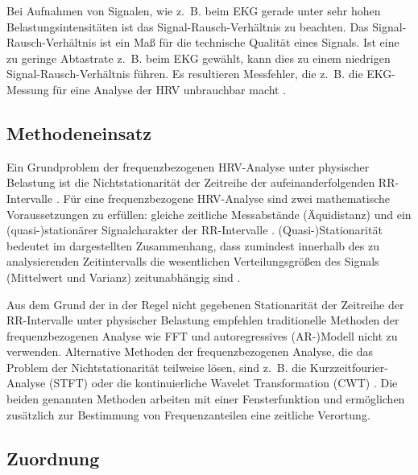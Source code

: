 Bei Aufnahmen von Signalen, wie z.~B. beim \ac{EKG} gerade unter sehr hohen Belastungsintensitäten ist das Signal-Rausch-Verhältnis zu beachten. Das Signal-Rausch-Verhältnis ist ein Maß für die technische Qualität eines Signals. Ist eine zu geringe Abtastrate z.~B. beim \ac{EKG} gewählt, kann dies zu einem niedrigen Signal-Rausch-Verhältnis führen. Es resultieren Messfehler, die z.~B. die \ac{EKG}-Messung für eine Analyse der \ac{HRV} unbrauchbar macht \citep[][]{Hoos2010}.


\subsection{Methodeneinsatz} %
\label{sub:methodeneinsatz}

Ein Grundproblem der frequenzbezogenen \ac{HRV}-Analyse unter physischer Belastung ist die Nichtstationarität der Zeitreihe der aufeinanderfolgenden RR-Intervalle \citep[][]{Hottenrott2006}. Für eine frequenzbezogene \ac{HRV}-Analyse sind zwei mathematische Voraussetzungen zu erfüllen: gleiche zeitliche Messabstände (Äquidistanz) und ein (quasi-)stationärer Signalcharakter der RR-Intervalle \citep[][]{Hoos2006}. (Quasi-)Stationarität bedeutet im dargestellten Zusammenhang, dass zumindest innerhalb des zu analysierenden Zeitintervalls die wesentlichen Verteilungsgrößen des Signals (Mittelwert und Varianz) zeitunabhängig sind \citep[][]{Hoos2006}.

Aus dem Grund der in der Regel nicht gegebenen Stationarität der Zeitreihe der RR-Intervalle unter physischer Belastung empfehlen \citet[S.~113]{Sarmiento2013} traditionelle Methoden der frequenzbezogenen Analyse wie \acs{FFT} und autoregressives (AR-)Modell nicht zu verwenden. Alternative Methoden der frequenzbezogenen Analyse, die das Problem der Nichtstationarität teilweise lösen, sind z.~B. die Kurzzeitfourier-Analyse (STFT) oder die kontinuierliche Wavelet Transformation (CWT) \citep[][S.~61f.]{Hoos2010}. Die beiden genannten Methoden arbeiten mit einer Fensterfunktion und ermöglichen zusätzlich zur Bestimmung von Frequenzanteilen eine zeitliche Verortung.  


\subsection{Zuordnung} %
\label{sub:zuordnung}

